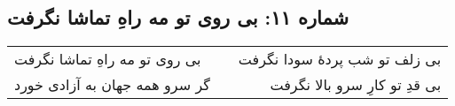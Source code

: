 \begin{center}
\section*{شماره ۱۱: بی روی تو مه راهِ تماشا نگرفت}
\label{sec:011}
\begin{longtable}{l p{0.5cm} r}
بی روی تو مه راهِ تماشا نگرفت
&&
بی زلف تو شب پردهٔ سودا نگرفت
\\
گر سرو همه جهان به آزادی خورد
&&
بی قدِ تو کارِ سرو بالا نگرفت
\\
\end{longtable}
\end{center}
